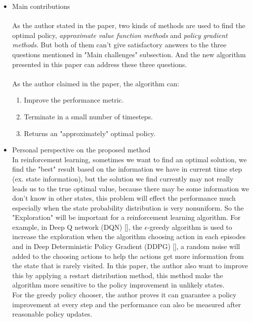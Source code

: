 \begin{itemize}
    \item Main contributions
    \paragraph{}
    As the author stated in the paper, two kinds of methods are used to find the optimal policy, 
    \emph{approximate value function methods} and \emph{policy gradient methods}. But both of them can't give satisfactory answers to the three questions mentioned in "Main challenges" subsection. And the new algorithm presented in this paper can address these three questions. 
    \paragraph{}
    As the author claimed in the paper, the algorithm can:
    \begin{enumerate}
    \item Improve the performance metric.
    \item Terminate in a small number of timesteps.
    \item Returns an "approximately" optimal policy.
    \\
    \end{enumerate}
    
    \item Personal perspective on the proposed method \\
    In reinforcement learning, sometimes we want to find an optimal solution, we
    find the "best" result based on the information we have in current time step
    (ex. state information), but the solution we find currently may not really 
    leads us to the true optimal value, because there may be some information we don't know in other states, this problem will effect the performance much especially when the state probability distribution is very nonuniform. So the "Exploration" will be important for a reinforcement learning algorithm. For example, in Deep Q network (DQN) [\cite{DBLP:journals/corr/MnihKSGAWR13}], the $\epsilon$-greedy algorithm is used to increase the
    exploration when the algorithm choosing action in each episodes and in Deep Deterministic Policy Gradient (DDPG) [\cite{DBLP:lillicrap2015continuous}], a random noise will added to the choosing actions to help the actions get more information from the state
    that is rarely visited. In this paper, the author also want to improve this by applying a restart distribution method, this method make the algorithm more sensitive to the policy improvement in unlikely states. \\
    For the greedy policy chooser, the author proves it can
    guarantee a policy improvement at every step and the performance can also be measured after reasonable policy updates.
    
\end{itemize}